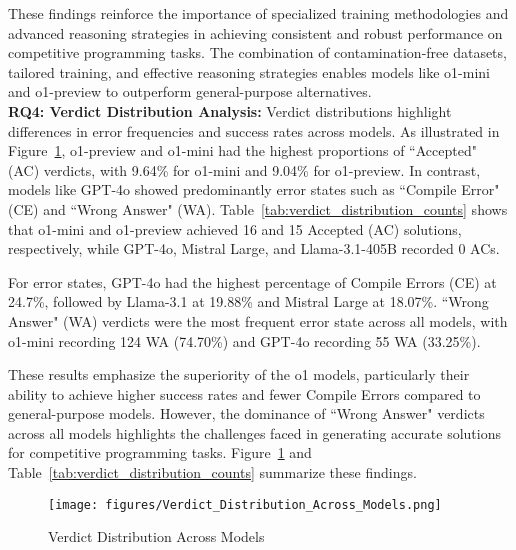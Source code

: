 These findings reinforce the importance of specialized training methodologies and advanced reasoning strategies in achieving consistent and robust performance on competitive programming tasks. The combination of contamination-free datasets, tailored training, and effective reasoning strategies enables models like o1-mini and o1-preview to outperform general-purpose alternatives.
\\
\textbf{RQ4: Verdict Distribution Analysis:}
Verdict distributions highlight differences in error frequencies and success rates across models. As illustrated in Figure~\ref{fig:verdict_distribution}, o1-preview and o1-mini had the highest proportions of ``Accepted" (AC) verdicts, with 9.64\% for o1-mini and 9.04\% for o1-preview. In contrast, models like GPT-4o showed predominantly error states such as ``Compile Error" (CE) and ``Wrong Answer" (WA). Table~\ref{tab:verdict_distribution_counts} shows that o1-mini and o1-preview achieved 16 and 15 Accepted (AC) solutions, respectively, while GPT-4o, Mistral Large, and Llama-3.1-405B recorded 0 ACs. 

For error states, GPT-4o had the highest percentage of Compile Errors (CE) at 24.7\%, followed by Llama-3.1 at 19.88\% and Mistral Large at 18.07\%. ``Wrong Answer" (WA) verdicts were the most frequent error state across all models, with o1-mini recording 124 WA (74.70\%) and GPT-4o recording 55 WA (33.25\%).

These results emphasize the superiority of the o1 models, particularly their ability to achieve higher success rates and fewer Compile Errors compared to general-purpose models. However, the dominance of ``Wrong Answer" verdicts across all models highlights the challenges faced in generating accurate solutions for competitive programming tasks. Figure~\ref{fig:verdict_distribution} and Table~\ref{tab:verdict_distribution_counts} summarize these findings.

\begin{figure}[htbp]
    \centering
    \texttt{[image: figures/Verdict\_Distribution\_Across\_Models.png]}
    \caption{Verdict Distribution Across Models}
    \label{fig:verdict_distribution}
\end{figure}

